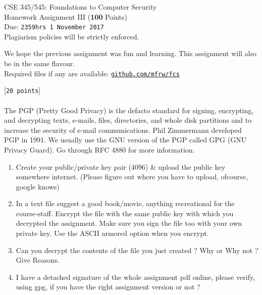 \documentclass[11pt]{article}
\begin{document}
\begin{center}
\LARGE CSE 345/545: Foundations to Computer Security \\
\Large Homework Assignment III (\textbf{100} Points) \\
\Large Due: \texttt{2359hrs 1 November 2017} \\
Plagiarism policies will be strictly enforced. \\
\end{center}

\noindent We hope the previous assignment was fun and learning. This assignment will also be in the same flavour.\\
Required files if any are available: \href{https://www.github.com/mfrw/fcs/}{\texttt{github.com/mfrw/fcs\\}}

 [\texttt{20 points}] \\\\
The PGP (Pretty Good Privacy) is the defacto standard for signing, encrypting, and decrypting texts, e-mails, files, directories, and whole disk partitions and to increase the security of e-mail communications. Phil Zimmermann developed PGP in 1991. We usually use the GNU version of the PGP called GPG (GNU Privacy Guard).
Go through RFC 4880 for more information.
\begin{enumerate}
	\item Create your public/private key pair (4096) \& upload the public key somewhere internet. (Please figure out where you have to upload, ofcourse, google knows)
	\item In a text file suggest a good book/movie, anything recreational for the course-staff. Encrypt the file with the same public key with which you decrypted the
		assignment. Make sure you sign the file too with your own private key. Use the ASCII armored option when you encrypt.
	\item Can you decrypt the contents of the file you just created ? Why or Why not ? Give Reasons.
	\item I have a detached signature of the whole assignment pdf online, please verify, using gpg, if you have the right assignment version or not ?
\end{enumerate}
\end{document}
